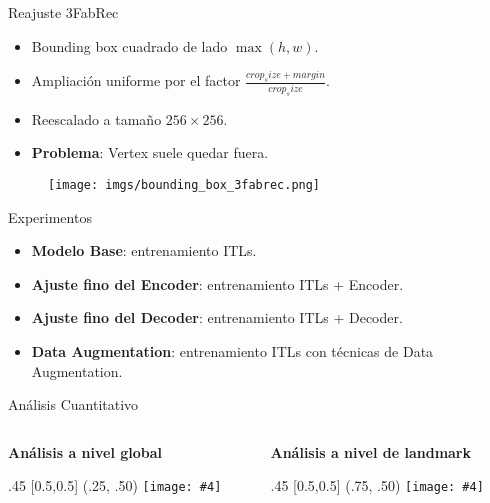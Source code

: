 \documentclass[aspectratio=43]{beamer}
\newcommand{\absimage}[4][0.5,0.5]{%
	\begin{textblock}{#3}%
		[#1]%
		(#2)%
		\texttt{[image: \#4]}%
\end{textblock}}
\begin{document}
\begin{frame}{Reajuste 3FabRec}
  \begin{itemize}
      \item Bounding box cuadrado de lado $\max(h,w)$.
      \item Ampliación uniforme por el factor $\frac{crop_size+margin}{crop_size}$.
      \item Reescalado a tamaño $256 \times 256$.
      \item \textbf{Problema}: Vertex suele quedar fuera.
  \end{itemize}
  \begin{figure}
    \centering
    \texttt{[image: imgs/bounding\_box\_3fabrec.png]}
  \end{figure}
\end{frame}

\begin{frame}{Experimentos}
  \begin{itemize}
    \item \textbf{Modelo Base}: entrenamiento ITLs.
    \item \textbf{Ajuste fino del Encoder}: entrenamiento ITLs + Encoder.
    \item \textbf{Ajuste fino del Decoder}: entrenamiento ITLs + Decoder.
    \item \textbf{Data Augmentation}: entrenamiento ITLs con técnicas de Data Augmentation.
  \end{itemize}
\end{frame}

\begin{frame}{Análisis Cuantitativo}
  \begin{columns}[onlytextwidth]
    \begin{column}{.5\textwidth}
      \centering \textcolor{tudCyan}{\textbf{Análisis a nivel global}}
      \absimage{.25, .50}{.45}{imgs/boxplot_sumarize.png}
    \end{column}
    \begin{column}{.5\textwidth}
      \centering \textcolor{tudCyan}{\textbf{Análisis a nivel de landmark}}
      \absimage{.75, .50}{.45}{imgs/tabla_landmarks.png}
    \end{column}
  \end{columns}
\end{frame}
\end{document}
